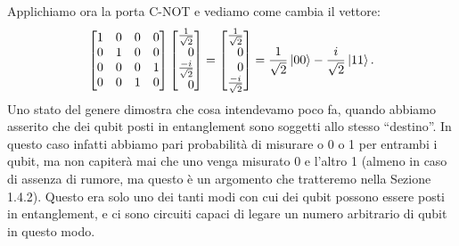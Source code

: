\documentclass{book}
\theoremstyle{definition}
\theoremstyle{definition}
\theoremstyle{definition}
\theoremstyle{plain}
\theoremstyle{plain}
\theoremstyle{plain}
\theoremstyle{plain}
\begin{document}
Applichiamo ora la porta C-NOT e vediamo come cambia il vettore:
\begin{displaymath}
\begin{bmatrix}
1 & 0 & 0 & 0\\
0 & 1 & 0 & 0\\
0 & 0 & 0 & 1\\
0 & 0 & 1 & 0
\end{bmatrix}
\begin{bmatrix*}[r]
\frac{1}{\sqrt{2}}\\
0\\
\frac{-i}{\sqrt{2}}\\
0
\end{bmatrix*} = 
\begin{bmatrix*}[r]
\frac{1}{\sqrt{2}}\\
0\\
0\\
\frac{-i}{\sqrt{2}}
\end{bmatrix*} = \frac{1}{\sqrt{2}} \ket{00} - \frac{i}{\sqrt{2}} \ket{11} .
\end{displaymath}
Uno stato del genere dimostra che cosa intendevamo poco fa, quando abbiamo asserito che dei qubit posti in entanglement sono soggetti allo stesso ``destino''. In questo caso infatti abbiamo pari probabilità di misurare o 0 o 1 per entrambi i qubit, ma non capiterà mai che uno venga misurato 0 e l'altro 1 (almeno in caso di assenza di rumore, ma questo è un argomento che tratteremo nella Sezione 1.4.2). Questo era solo uno dei tanti modi con cui dei qubit possono essere posti in entanglement, e ci sono circuiti capaci di legare un numero arbitrario di qubit in questo modo.
\end{document}
